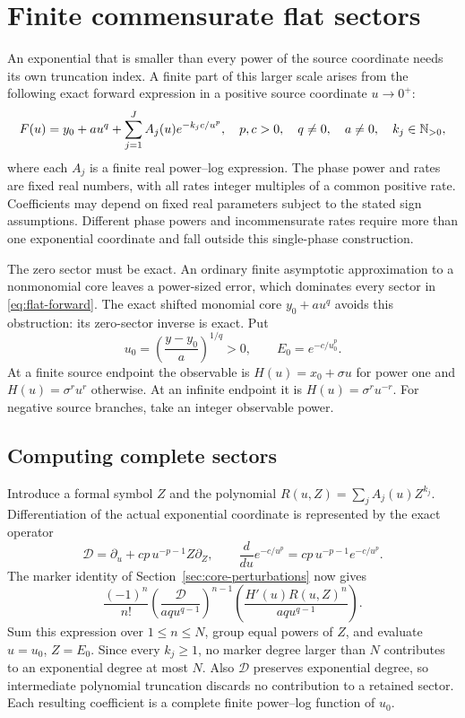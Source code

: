 \section{Finite commensurate flat sectors}
\label{sec:flat-sectors}

An exponential that is smaller than every power of the source coordinate
needs its own truncation index. A finite part of this larger scale arises
from the following exact forward expression in a positive source coordinate
$u\to0^+$:
\begin{equation}
 F(u)=y_0+a u^q+\sum_{j=1}^J A_j(u)e^{-k_j c/u^p},
 \quad p,c>0,\quad q\ne0,\quad a\ne0,\quad k_j\in\mathbb N_{>0},
 \label{eq:flat-forward}
\end{equation}
where each $A_j$ is a finite real power--log expression. The phase power and
rates are fixed real numbers, with all rates integer multiples of a common
positive rate. Coefficients may depend on fixed real parameters subject to
the stated sign assumptions. Different phase powers and incommensurate
rates require more than one exponential coordinate and fall outside this
single-phase construction.

The zero sector must be exact. An ordinary finite asymptotic approximation
to a nonmonomial core leaves a power-sized error, which dominates every
sector in \eqref{eq:flat-forward}. The exact shifted monomial core
$y_0+a u^q$ avoids this obstruction: its zero-sector inverse is exact. Put
\[
 u_0=\left(\frac{y-y_0}{a}\right)^{1/q}>0,
 \qquad E_0=e^{-c/u_0^p}.
\]
At a finite source endpoint the observable is
$H(u)=x_0+\sigma u$ for power one and $H(u)=\sigma^r u^r$ otherwise.
At an infinite endpoint it is $H(u)=\sigma^r u^{-r}$.
For negative source branches, take an integer observable power.

\subsection{Computing complete sectors}

Introduce a formal symbol $Z$ and the polynomial
$R(u,Z)=\sum_j A_j(u)Z^{k_j}$. Differentiation of the actual exponential
coordinate is represented by the exact operator
\[
 \mathcal D=\partial_u+cp\,u^{-p-1}Z\partial_Z,
 \qquad \frac{d}{du}e^{-c/u^p}=cp\,u^{-p-1}e^{-c/u^p}.
\]
The marker identity of Section~\ref{sec:core-perturbations} now gives
\begin{equation}
 \frac{(-1)^n}{n!}
 \left(\frac{\mathcal D}{a q u^{q-1}}\right)^{n-1}
 \left(\frac{H'(u)R(u,Z)^n}{a q u^{q-1}}\right).
 \label{eq:flat-marker-coefficients}
\end{equation}
Sum this expression over $1\le n\le N$, group equal powers of $Z$, and
evaluate $u=u_0$, $Z=E_0$. Since every $k_j\ge1$, no marker degree larger
than $N$ contributes to an exponential degree at most $N$. Also
$\mathcal D$ preserves exponential degree, so intermediate polynomial
truncation discards no contribution to a retained sector. Each resulting
coefficient is a complete finite power--log function of $u_0$.


